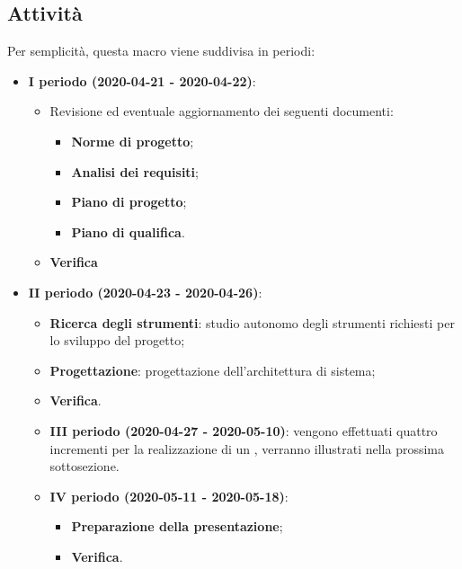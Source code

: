 \documentclass[../piano-di-progetto.tex]{subfiles}
\begin{document}
\subsection{Attività}   
Per semplicità, questa macro viene suddivisa in periodi:
\begin{itemize}

    \item \textbf{I periodo (2020-04-21 - 2020-04-22)}: \\
        \begin{itemize}
            \item Revisione ed eventuale aggiornamento dei seguenti documenti:
            \begin{itemize}
                \item \textbf{Norme di progetto};
                \item \textbf{Analisi dei requisiti};
                \item \textbf{Piano di progetto};
                \item \textbf{Piano di qualifica}.
            \end{itemize}

            \item \textbf{Verifica}
        \end{itemize}

    \item \textbf{II periodo (2020-04-23 - 2020-04-26)}:
        \begin{itemize}
            \item \textbf{Ricerca degli strumenti}: studio autonomo degli strumenti richiesti per lo sviluppo del progetto; 
            \item \textbf{Progettazione}: progettazione dell'architettura di sistema;
            \item \textbf{Verifica}.
    \item \textbf{III periodo (2020-04-27 - 2020-05-10)}: vengono effettuati quattro incrementi per la realizzazione di un , verranno illustrati nella prossima sottosezione.
    \item \textbf{IV periodo (2020-05-11 - 2020-05-18)}: 
            \begin{itemize}
                \item \textbf{Preparazione della presentazione};
                \item \textbf{Verifica}.
            \end{itemize}
        \end{itemize}
    
\end{itemize}
\end{document}

